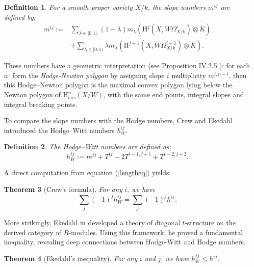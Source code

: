 \documentclass[a4paper,12pt,twoside]{report}
\newtheorem{theorem}{Theorem}[section]
\newtheorem{definition}[theorem]{Definition}
\newcommand{\cris}{\mathrm{cris}}
\newcommand{\HH}{\mathrm{H}}
\begin{document}
\begin{definition}\label{mij}
    For a smooth proper variety $X/k$, \emph{the slope numbers} $m^{ij}$ are defined by:
\begin{equation}
    \begin{aligned}
    m^{ij}:=&\sum_{\lambda\in [0,1)}(1-\lambda)m_{\lambda}(\HH^j(X,W\Omega^i_{X/k})\otimes K)\\
    &+\sum_{\lambda\in [0,1)}\lambda m_{\lambda}(\HH^{j+1}(X,W\Omega^{i-1}_{X/k})\otimes K).
    \end{aligned}
\end{equation}
\end{definition}

These numbers have a geometric interpretation (see Proposition IV.2.5 \cite{Ek3}): 
for each $n$: form the \emph{Hodge-Newton polygon} 
by assigning slope $i$ multiplicity $m^{i,n-i}$, then this Hodge--Newton polygon is the
maximal convex polygon lying below the Newton polygon of $\HH^n_{\cris}(X/W)$,
with the same end points, integral slopes and integral breaking points.

To compare the slope numbers with the Hodge numbers, 
Crew and Ekedahl introduced the Hodge--Witt numbers $h_W^{ij}$. 

\begin{definition}
    The Hodge--Witt numbers are defined as: \[h_W^{ij}:=m^{ij}+T^{ij}-2T^{i-1,j+1}+T^{i-2,j+2}.\]
\end{definition}

A direct computation from equation (\ref{lengtheq}) yields: 

\begin{theorem}[Crew's formula]\cite[Theorem 4]{Cr}\label{CrewFor} For any $i$, we have 
    \begin{equation}
        \sum_{j}(-1)^j h^{ij}_W=\sum_j(-1)^j h^{ij}.
    \end{equation}
\end{theorem}

More strikingly, Ekedahl in \cite{Ek3} developed a theory of diagonal $t$-structure 
on the derived category of $R$-modules. Using this framework, he proved a fundamental inequality, 
revealing deep connections between Hodge-Witt and Hodge numbers.

\begin{theorem}[Ekedahl's inequality] \cite[Theorem IV 3.3]{Ek3}\label{Ekeineq} For any $i$ and $j$, we have $h_W^{ij}\leqslant h^{ij}$. 
\end{theorem}
\end{document}

